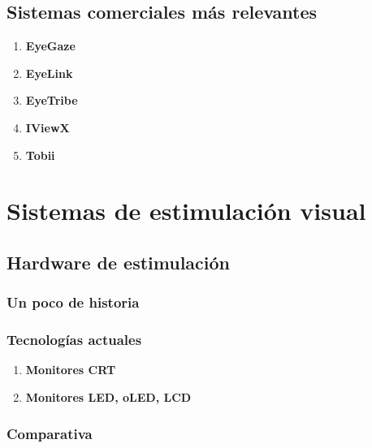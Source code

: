 \documentclass[../main.tex]{subfiles}
\begin{document}
	\subsection{Sistemas comerciales más relevantes}
	\label{sub:02_sistemas_comerciales_más_relevantes}
		\begin{enumerate}
			\item \textbf{EyeGaze}

			\item \textbf{EyeLink}

			\item \textbf{EyeTribe}

			\item \textbf{IViewX}

			\item \textbf{Tobii}

		\end{enumerate}

\section{Sistemas de estimulación visual}
\label{sec:02_sistemas_de_estimulación_visual}
	\subsection{Hardware de estimulación}
	\label{sub:02_hardware_de_estimulación}
		\subsubsection{Un poco de historia} 
		\label{ssub:02_un_poco_de_historia}

		\subsubsection{Tecnologías actuales} 
		\label{ssub:02_tecnologías_actuales}
			\begin{enumerate}
				\item \textbf{Monitores CRT}

				\item \textbf{Monitores LED, oLED, LCD}

			\end{enumerate}

		\subsubsection{Comparativa}
		\label{ssub:02_comparativa_monitores}
		
\end{document}

